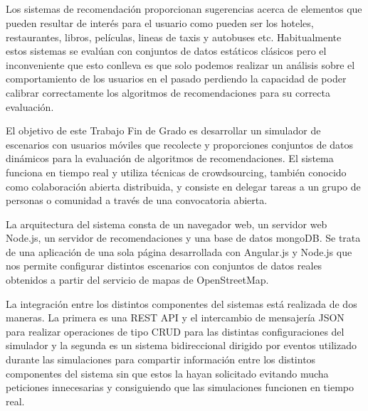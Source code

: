 \chapter*{}

\cleardoublepage
\thispagestyle{empty}

\begin{center}
{\large\bfseries \myTitle}\\
\end{center}

\vspace{0.7cm}
\\

Los sistemas de recomendación proporcionan sugerencias acerca de elementos que pueden resultar de interés para el usuario como pueden ser los hoteles, restaurantes, libros, películas, lineas de taxis y autobuses etc. Habitualmente estos sistemas se evalúan con conjuntos de datos estáticos clásicos pero el inconveniente que esto conlleva es que solo podemos realizar un análisis sobre el comportamiento de los usuarios en el pasado perdiendo la capacidad de poder calibrar correctamente los algoritmos de recomendaciones para su correcta evaluación.

El objetivo de este Trabajo Fin de Grado es desarrollar un simulador de escenarios con usuarios móviles que recolecte y proporciones conjuntos de datos dinámicos para la evaluación de algoritmos de recomendaciones. El sistema funciona en tiempo real y utiliza técnicas de crowdsourcing, también conocido como colaboración abierta distribuida, y consiste en delegar tareas a un grupo de personas o comunidad a través de una convocatoria abierta.

La arquitectura del sistema consta de un navegador web, un servidor web Node.js, un servidor de recomendaciones y una base de datos mongoDB. Se trata de una aplicación de una sola página desarrollada con Angular.js y Node.js que nos permite configurar distintos escenarios con conjuntos de datos reales obtenidos a partir del servicio de mapas de OpenStreetMap.

La integración entre los distintos componentes del sistemas está realizada de dos maneras. La primera es una REST API y el intercambio de mensajería JSON para realizar operaciones de tipo CRUD para las distintas configuraciones del simulador y la segunda es un sistema bidireccional dirigido por eventos utilizado durante las simulaciones para compartir información entre los distintos componentes del sistema sin que estos la hayan solicitado evitando mucha peticiones innecesarias y consiguiendo que las simulaciones funcionen en tiempo real.

